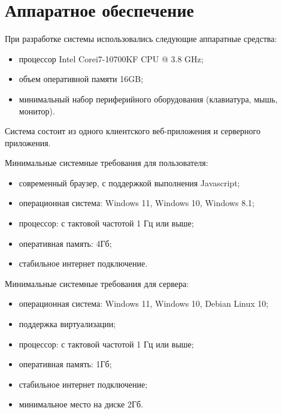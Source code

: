 \documentclass[../nirs.tex]{subfiles}
\begin{document}
    \section{Аппаратное обеспечение}
    При разработке системы использовались следующие аппаратные средства:

    \begin{itemize}
        \item процессор Intel Core\texttrademark\space i7-10700KF CPU @ 3.8 GHz;
        \item объем оперативной памяти 16GB;
        \item минимальный набор периферийного оборудования (клавиатура, мышь,
            монитор).
    \end{itemize}

    Система состоит из одного клиентского веб-приложения и серверного приложения.

    Минимальные системные требования для пользователя:
    \begin{itemize}
        \item современный браузер, с поддержкой выполнения Javascript;
        \item операционная система: Windows 11, Windows 10, Windows 8.1;
        \item процессор: с тактовой частотой 1 Гц или выше;
        \item оперативная память: 4Гб;
        \item стабильное интернет подключение.
    \end{itemize}

    Минимальные системные требования для сервера:
    \begin{itemize}
        \item операционная система: Windows 11, Windows 10, Debian Linux 10;
        \item поддержка виртуализации;
        \item процессор: с тактовой частотой 1 Гц или выше;
        \item оперативная память: 1Гб;
        \item стабильное интернет подключение;
        \item минимальное место на диске 2Гб.
    \end{itemize}
\end{document}
